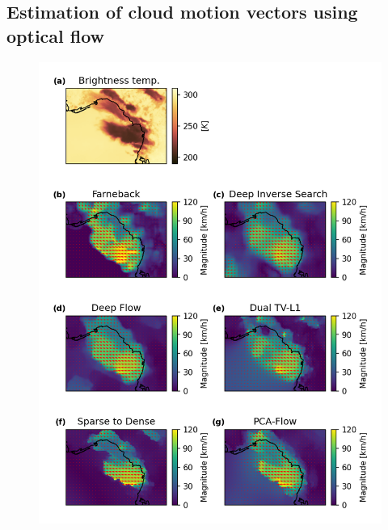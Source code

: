\subsection{Estimation of cloud motion vectors using optical flow}

\begin{figure}[t]
    \includegraphics[width=\textwidth]{figures/chapter1_10.png}
    \caption[
    A comparison of the motion vector fields generated by different optical flow methods
    ]{}
    \label{fig:opt_flow_comparison}
\end{figure}


